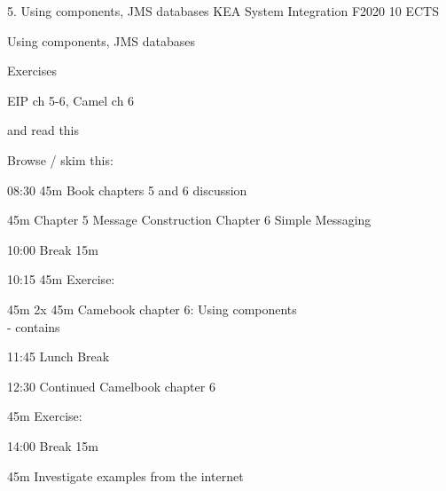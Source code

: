 \documentclass[Screen16to9,17pt]{foils}
\begin{document}
\mytitlepage
{5. Using components, JMS
 databases}
{KEA System Integration F2020 10 ECTS}


\begin{list2}
\item
Using components, JMS
 databases

\item
\item
\end{list2}

Exercises
\begin{list2}
\item
\item
\end{list2}




\begin{list1}
\item EIP ch 5-6, Camel ch 6

and read this\\

\item Browse / skim this:\\

\end{list1}




\begin{list2}
\item 08:30 45m Book chapters 5 and 6 discussion
\item 45m Chapter 5 Message Construction Chapter 6 Simple Messaging
\item 10:00 Break 15m
\item 10:15 45m Exercise:
\item 45m 2x 45m Camebook chapter 6: Using components\\
 - contains
\item 11:45 Lunch Break
\item 12:30 Continued Camelbook chapter 6
\item 45m Exercise:
\item 14:00 Break 15m
\item 45m Investigate examples from the internet
\end{list2}



\end{document}
